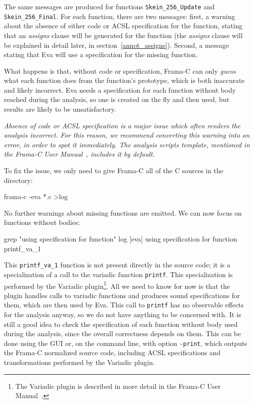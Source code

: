 \documentclass[web]{frama-c-book}
\makeatletter
\newenvironment{important}%
{\hspace{5pt plus \linewidth minus \marginparsep}%
 \begin{lrbox}{\@tempboxa}%
   \begin{minipage}{\linewidth - 2\fboxsep}\itshape}
{\end{minipage}\end{lrbox}\colorbox{gris}{\usebox{\@tempboxa}}}
\newcommand{\Eva}{\textsf{Eva}}
\makeatother
\begin{document}
The same messages are produced for functions \verb|Skein_256_Update| and
\verb|Skein_256_Final|.
For each function, there are two messages: first, a warning about the absence
of either code or ACSL specification for the function, stating
that an {\em assigns} clause will be generated for the function
(the {\em assigns} clause will be explained in detail later, in
section~\ref{annot_assigns}). Second, a message stating that \Eva{} will use a
specification for the missing function.

What happens is that, without code or specification, Frama-C can only
{\em guess} what each function does from the function's prototype,
which is both inaccurate and likely incorrect. \Eva{} needs a specification
for each function without body reached during the analysis, so one is created
on the fly and then used, but results are likely to be unsatisfactory.

\begin{important}
  Absence of code or ACSL specification is a major issue which often renders
  the analysis incorrect. For this reason, we recommend converting this warning
  into an error, in order to spot it immediately.
  The {\em analysis scripts template}, mentioned in the Frama-C User
  Manual~\cite{FCUserMan}, includes it by default.
\end{important}

To fix the issue, we only need to give Frama-C all of the C sources in
the directory:
\begin{listing-nonumber}
frama-c -eva *.c >log
\end{listing-nonumber}

No further warnings about missing functions are emitted. We can now focus on
functions without bodies:
\begin{listing-nonumber}
grep "using specification for function" log
[eva] using specification for function printf_va_1
\end{listing-nonumber}
This \verb|printf_va_1| function is not present directly in the source code;
it is a specialization of a call to the variadic function \verb|printf|. This
specialization is performed by the \textsf{Variadic} plugin\footnote{The
  \textsf{Variadic} plugin is described in more detail in the Frama-C User
  Manual~\cite{FCUserMan}.}.
All we need to know for now is that the plugin handles calls to variadic functions
and produces sound specifications for them, which are then used by \Eva{}.
This call to \verb|printf| has no observable effects for the analysis anyway,
so we do not have anything to be concerned with. It is still a good idea to
check the specification of each function without body used during the analysis,
since the overall correctness depends on them. This can be done using the
GUI or, on the command line, with option \verb|-print|, which outputs the
Frama-C normalized source code, including ACSL specifications and
transformations performed by the \textsf{Variadic} plugin.
\end{document}
